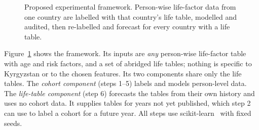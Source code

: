 \documentclass[runningheads]{llncs}
\begin{document}
\begin{figure}[t]
\centering
{}
\caption{Proposed experimental framework. Person-wise life-factor data from one country are
labelled with that country's life table, modelled and audited, then re-labelled and forecast for
every country with a life table.}
\label{fig:framework}
\end{figure}

Figure~\ref{fig:framework} shows the framework. Its inputs are \emph{any} person-wise life-factor
table with age and risk factors, and a set of abridged life tables; nothing is specific to
Kyrgyzstan or to the chosen features. Its two components share only the life tables. The
\emph{cohort component} (steps 1--5) labels and models person-level data. The \emph{life-table
component} (step 6) forecasts the tables from their own history and uses no cohort data. It
supplies tables for years not yet published, which step 2 can use to label a cohort for a future
year. All steps use scikit-learn~\cite{pedregosa2011} with fixed seeds.
\end{document}
